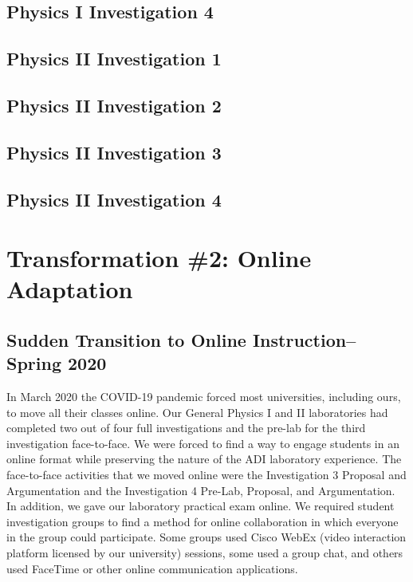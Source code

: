 \documentclass[aip, numerical, preprint]{revtex4-2}
\begin{document}
\subsection{Physics \textrm{I} Investigation 4}

\subsection{Physics \textrm{II} Investigation 1}

\subsection{Physics \textrm{II} Investigation 2}

\subsection{Physics \textrm{II} Investigation 3}

\subsection{Physics \textrm{II} Investigation 4}


\section{Transformation \#2: Online Adaptation}

\subsection{Sudden Transition to Online Instruction--Spring 2020}

In March 2020 the COVID-19 pandemic forced most universities, including ours, to move all their
classes online. Our General Physics I and II laboratories had completed two out of four full
investigations and the pre-lab for the third investigation face-to-face. We were forced to find
a way to engage students in an online format while preserving the nature of the ADI laboratory
experience. The face-to-face activities that we moved online were the Investigation 3 Proposal
and Argumentation and the Investigation 4 Pre-Lab, Proposal, and Argumentation. In addition, we
gave our laboratory practical exam online. We required student investigation groups to find a
method for online collaboration in which everyone in the group could participate. Some groups
used Cisco WebEx (video interaction platform licensed by our university) sessions, some used a
group chat, and others used FaceTime or other online communication applications.
\end{document}
